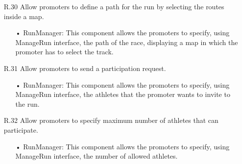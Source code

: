 \begin{enumerate}
\begin{enumerate}
	\item [R.30] Allow promoters to define a path for the run by selecting the routes inside a map.
		\begin{enumerate}
		\item[•] RunManager: This component allows the promoters to specify, using ManageRun interface, the path of the race, displaying a map in which the promoter has to select the track.
		\end{enumerate}	
	\item [R.31] Allow promoters to send a participation request.
		\begin{enumerate}
		\item[•] RunManager: This component allows the promoters to specify, using ManageRun interface, the athletes that the promoter wants to invite to the run.
		\end{enumerate}	
	\item [R.32] Allow promoters to specify maximum number of athletes that can participate.
		\begin{enumerate}
		\item[•] RunManager: This component allows the promoters to specify, using ManageRun interface, the number of allowed athletes.
		\end{enumerate}	
	\end{enumerate}	
	

\end{enumerate}
